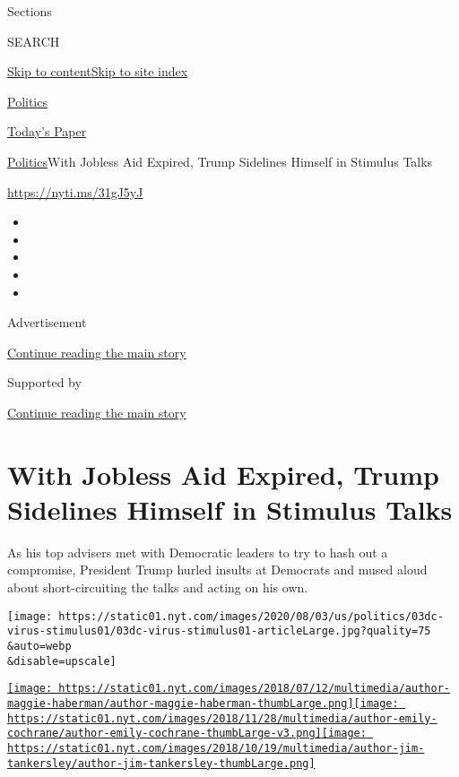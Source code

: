 Sections

SEARCH

\protect\hyperlink{site-content}{Skip to
content}\protect\hyperlink{site-index}{Skip to site index}

\href{https://www.nytimes.com/section/politics}{Politics}

\href{https://myaccount.nytimes.com/auth/login?response_type=cookie\&client_id=vi}{}

\href{https://www.nytimes.com/section/todayspaper}{Today's Paper}

\href{/section/politics}{Politics}\textbar{}With Jobless Aid Expired,
Trump Sidelines Himself in Stimulus Talks

\href{https://nyti.ms/31gJ5yJ}{https://nyti.ms/31gJ5yJ}

\begin{itemize}
\item
\item
\item
\item
\item
\end{itemize}

Advertisement

\protect\hyperlink{after-top}{Continue reading the main story}

Supported by

\protect\hyperlink{after-sponsor}{Continue reading the main story}

\hypertarget{with-jobless-aid-expired-trump-sidelines-himself-in-stimulus-talks}{%
\section{With Jobless Aid Expired, Trump Sidelines Himself in Stimulus
Talks}\label{with-jobless-aid-expired-trump-sidelines-himself-in-stimulus-talks}}

As his top advisers met with Democratic leaders to try to hash out a
compromise, President Trump hurled insults at Democrats and mused aloud
about short-circuiting the talks and acting on his own.

\texttt{[image: https://static01.nyt.com/images/2020/08/03/us/politics/03dc-virus-stimulus01/03dc-virus-stimulus01-articleLarge.jpg?quality=75\\\&auto=webp\\\&disable=upscale]}

\href{https://www.nytimes.com/by/maggie-haberman}{\texttt{[image: https://static01.nyt.com/images/2018/07/12/multimedia/author-maggie-haberman/author-maggie-haberman-thumbLarge.png]}}\href{https://www.nytimes.com/by/emily-cochrane}{\texttt{[image: https://static01.nyt.com/images/2018/11/28/multimedia/author-emily-cochrane/author-emily-cochrane-thumbLarge-v3.png]}}\href{https://www.nytimes.com/by/jim-tankersley}{\texttt{[image: https://static01.nyt.com/images/2018/10/19/multimedia/author-jim-tankersley/author-jim-tankersley-thumbLarge.png]}}

